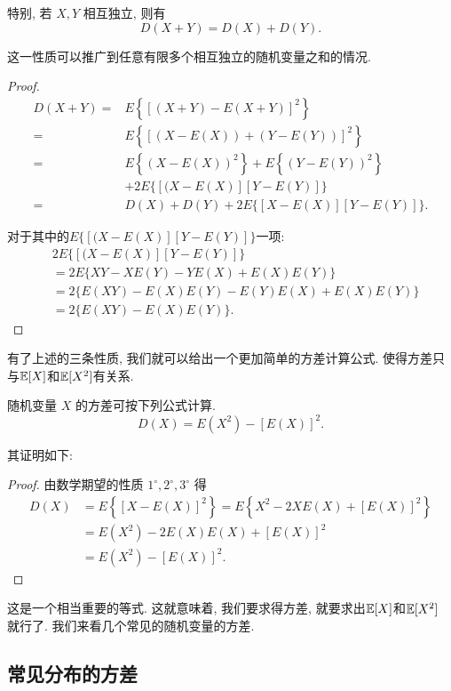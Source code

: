    特别, 若 $X, Y$ 相互独立, 则有
   $$
   D(X+Y)=D(X)+D(Y) .
   $$
   
   这一性质可以推广到任意有限多个相互独立的随机变量之和的情况.

   \begin{proof}
    $$
\begin{aligned}
D(X+Y)= & E\left\{[(X+Y)-E(X+Y)]^2\right\} \\
= & E\left\{[(X-E(X))+(Y-E(Y))]^2\right\} \\
= & E\left\{(X-E(X))^2\right\}+E\left\{(Y-E(Y))^2\right\} \\
& +2 E\{[(X-E(X)][Y-E(Y)]\} \\
= & D(X)+D(Y)+2 E\{[X-E(X)][Y-E(Y)]\} .
\end{aligned}
$$

对于其中的$ E\{[(X-E(X)][Y-E(Y)]\}$一项: $$
\begin{aligned}
& 2 E\{[(X-E(X)][Y-E(Y)]\} \\
& =2 E\{X Y-X E(Y)-Y E(X)+E(X) E(Y)\} \\
& =2\{E(X Y)-E(X) E(Y)-E(Y) E(X)+E(X) E(Y)\} \\
& =2\{E(X Y)-E(X) E(Y)\} .
\end{aligned}
$$
   \end{proof}

   有了上述的三条性质, 我们就可以给出一个更加简单的方差计算公式. 使得方差只与$\mathbb E[X]$和$\mathbb E[X^2]$有关系. 

   \begin{proposition}
       随机变量 $X$ 的方差可按下列公式计算.
   $$
   D(X)=E\left(X^2\right)-[E(X)]^2 .
   $$
   \end{proposition}
   
   其证明如下: 
   \begin{proof}
       由数学期望的性质 $1^{\circ}, 2^{\circ}, 3^{\circ}$ 得
   $$
   \begin{aligned}
   D(X) & =E\left\{[X-E(X)]^2\right\}=E\left\{X^2-2 X E(X)+[E(X)]^2\right\} \\
   & =E\left(X^2\right)-2 E(X) E(X)+[E(X)]^2 \\
   & =E\left(X^2\right)-[E(X)]^2 .
   \end{aligned}
   $$
      \end{proof}

     
    这是一个相当重要的等式. 这就意味着, 我们要求得方差, 就要求出$\mathbb E[X]$和$\mathbb E[X^2]$ 就行了. 我们来看几个常见的随机变量的方差. 

    \subsection{常见分布的方差}
